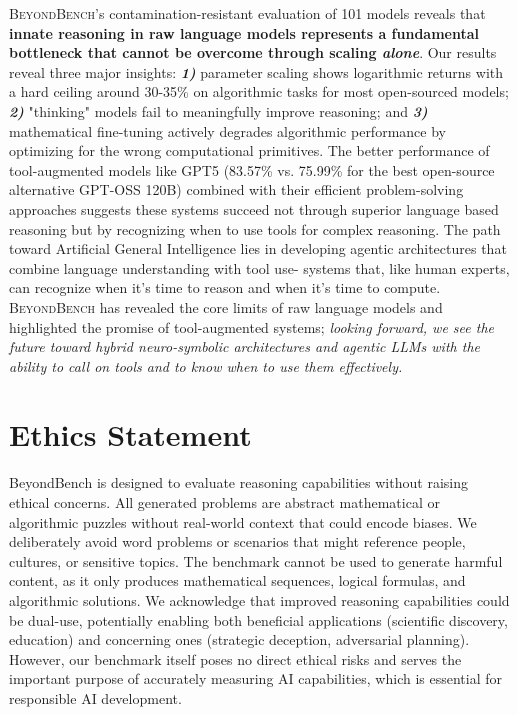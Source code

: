 \documentclass{article} %
\theoremstyle{plain}
\theoremstyle{definition}
\newcommand{\our}{\textsc{BeyondBench}\xspace}
\begin{document}
\our's contamination-resistant evaluation of 101 models reveals that \textbf{innate reasoning in raw language models represents a fundamental bottleneck that cannot be overcome through scaling \textit{alone}}. Our results reveal three major insights: \textbf{\textit{1)}} parameter scaling shows logarithmic returns with a hard ceiling around 30-35\% on algorithmic tasks for most open-sourced models; \textbf{\textit{2)}} "thinking" models fail to meaningfully improve reasoning; and \textbf{\textit{3)}} mathematical fine-tuning actively degrades algorithmic performance by optimizing for the wrong computational primitives. The better performance of tool-augmented models like GPT5 (83.57\% vs. 75.99\% for the best open-source alternative GPT-OSS 120B) combined with their efficient problem-solving approaches suggests these systems succeed not through superior language based reasoning but by recognizing when to use tools for complex reasoning. The path toward Artificial General Intelligence lies in developing agentic architectures that combine language understanding with tool use- systems that, like human experts, can recognize when it’s time to reason and when it’s time to compute. \our has revealed the core limits of raw language models and highlighted the promise of tool-augmented systems; \textit{looking forward, we see the future toward hybrid neuro-symbolic architectures and agentic LLMs with the ability to call on tools and to know when to use them effectively.}



\section*{Ethics Statement}

BeyondBench is designed to evaluate reasoning capabilities without raising ethical concerns. All generated problems are abstract mathematical or algorithmic puzzles without real-world context that could encode biases. We deliberately avoid word problems or scenarios that might reference people, cultures, or sensitive topics. The benchmark cannot be used to generate harmful content, as it only produces mathematical sequences, logical formulas, and algorithmic solutions. We acknowledge that improved reasoning capabilities could be dual-use, potentially enabling both beneficial applications (scientific discovery, education) and concerning ones (strategic deception, adversarial planning). However, our benchmark itself poses no direct ethical risks and serves the important purpose of accurately measuring AI capabilities, which is essential for responsible AI development.
\end{document}
